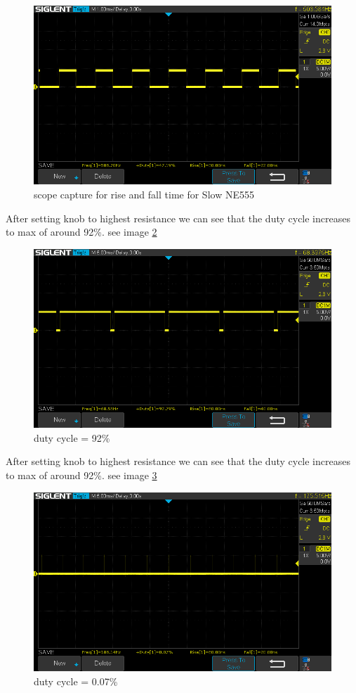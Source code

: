 \documentclass[a4paper,11pt]{article}%
\begin{document}
\begin{figure}[H]
	\centering
	\includegraphics[scale=0.5]{figures/555_fast}
	\caption{scope capture for rise and fall time for Slow NE555}
	\label{555_fast}
\end{figure}


After setting knob to highest resistance we can see that the duty cycle increases to max of around 92\%. see image \ref{90_duty}
\begin{figure}[H]
	\centering
	\includegraphics[scale=0.6]{figures/90_duty}
	\caption{duty cycle = 92\%}
	\label{90_duty}
\end{figure}

After setting knob to highest resistance we can see that the duty cycle increases to max of around 92\%. see image \ref{0_duty}
\begin{figure}[H]
	\centering
	\includegraphics[scale=0.6]{figures/0_duty}
	\caption{duty cycle = 0.07\%}
	\label{0_duty}
\end{figure}
\end{document}
